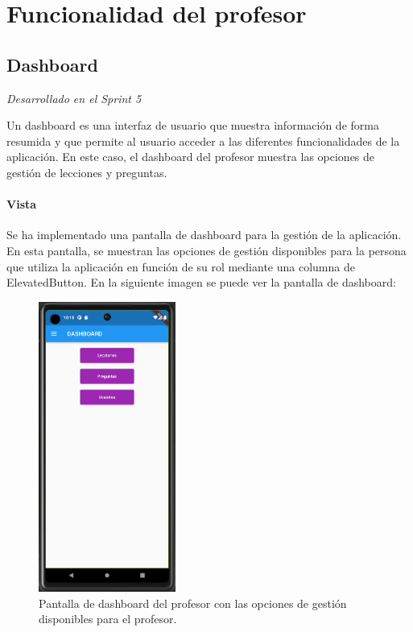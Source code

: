 \section{Funcionalidad del profesor}

\subsection{Dashboard}
\textit{Desarrollado en el Sprint 5}
\label{sec:dashboard}

Un dashboard es una interfaz de usuario que muestra información de forma resumida y que permite al usuario acceder a las diferentes funcionalidades de la aplicación. En este caso, el dashboard del profesor muestra las opciones de gestión de lecciones y preguntas.

\paragraph*{Vista}
Se ha implementado una pantalla de dashboard para la gestión de la aplicación. En esta pantalla, se muestran las opciones de gestión disponibles para la persona que utiliza la aplicación en función de su rol mediante una columna de ElevatedButton. En la siguiente imagen se puede ver la pantalla de dashboard:

\begin{figure}[H]
  \centering
  \includegraphics[width=0.4\textwidth]{imagenes/c7/dashboard.png}
  \caption{Pantalla de dashboard del profesor con las opciones de gestión disponibles para el profesor.}
  \label{fig:login}
\end{figure}


